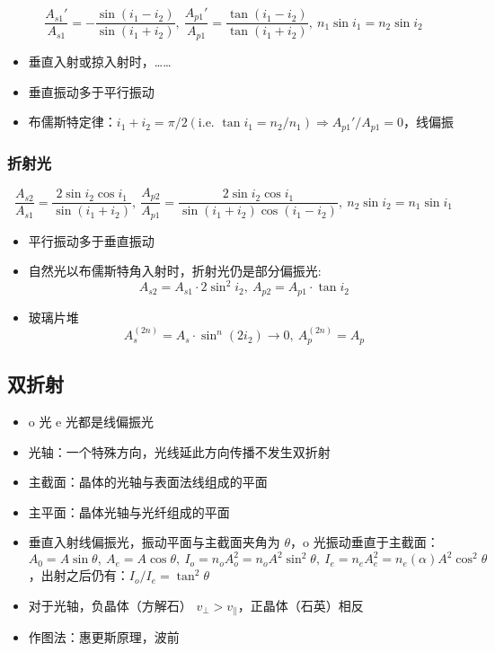 \documentclass{article}
\begin{document}
$$
\frac{A_{s1}'}{A_{s1}}=-\frac{\sin(i_1-i_2)}{\sin(i_1+i_2)},\ \frac{A_{p1}'}{A_{p1}}=\frac{\tan(i_1-i_2)}{\tan(i_1+i_2)},\ n_1\sin i_1=n_2\sin i_2
$$
\begin{itemize}
    \item 垂直入射或掠入射时，……
    \item 垂直振动多于平行振动
    \item 布儒斯特定律：$i_1+i_2=\pi/2(\text{i.e. }\tan i_1=n_2/n_1)\Rightarrow A_{p1}'/A_{p1}=0$，线偏振
\end{itemize}

\subsubsection{折射光}

$$
\frac{A_{s2}}{A_{s1}}=\frac{2\sin i_2\cos i_1}{\sin(i_1+i_2)},\ \frac{A_{p2}}{A_{p1}}=\frac{2\sin i_2\cos i_1}{\sin(i_1+i_2)\cos(i_1-i_2)},\ n_2\sin i_2=n_1\sin i_1
$$
\begin{itemize}
    \item 平行振动多于垂直振动
    \item 自然光以布儒斯特角入射时，折射光仍是部分偏振光: $$
A_{s2}=A_{s1}\cdot 2\sin^2i_2,\ A_{p2}=A_{p1}\cdot\tan i_2
$$
    \item 玻璃片堆 $$
A_{s}^{(2n)}=A_s\cdot\sin^n(2i_2)\to 0,\ A_{p}^{(2n)}=A_p
$$
\end{itemize}

\subsection{双折射}

\begin{itemize}
    \item o 光 e 光都是线偏振光
    \item 光轴：一个特殊方向，光线延此方向传播不发生双折射
    \item 主截面：晶体的光轴与表面法线组成的平面
    \item 主平面：晶体光轴与光纤组成的平面
    \item 垂直入射线偏振光，振动平面与主截面夹角为 $\theta$，o 光振动垂直于主截面：$A_0=A\sin\theta,\ A_e=A\cos\theta,\ I_o=n_oA_o^2=n_oA^2\sin^2\theta,\ I_e=n_eA_e^2=n_e(\alpha)A^2\cos^2\theta$，出射之后仍有：$I_o/I_e=\tan^2\theta$
    \item 对于光轴，负晶体（方解石） $v_{\perp}>v_{\parallel}$，正晶体（石英）相反
    \item 作图法：惠更斯原理，波前
\end{itemize}
\end{document}
